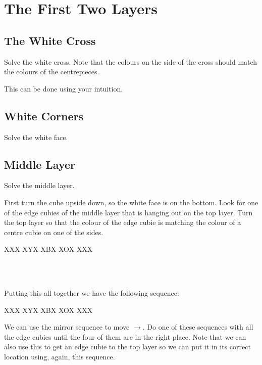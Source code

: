\section{The First Two Layers}

\subsection{The White Cross}

\begin{goal}
    Solve the white cross.
    Note that the colours on the side of the cross should match the colours of the centrepieces.
\end{goal}
This can be done using your intuition.

\subsection{White Corners}

\begin{goal}
    Solve the white face.
\end{goal}


\subsection{Middle Layer}

\begin{goal}
    Solve the middle layer.
\end{goal}

First turn the cube upside down, so the white face is on the bottom.
Look for one of the edge cubies of the middle layer that is hanging out on the top layer.
Turn the top layer so that the colour of the edge cubie is matching the colour of a centre cubie on one of the sides.


\RubikFaceUp XXX XYX XBX
\RubikSliceTopR XOX XXX

\\
\\
\notextcube

Putting this all together we have the following sequence:


\RubikFaceUp XXX XYX XBX
\RubikSliceTopR XOX XXX
\notextcube
{}
\notextcube

We can use the mirror sequence to move $\to$.
Do one of these sequences with all the edge cubies until the four of them are in the right place.
Note that we can also use this to get an edge cubie to the top layer so we can put it in its correct location using, again, this sequence.
